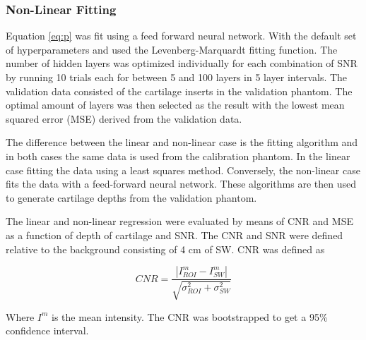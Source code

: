 \documentclass[a4paper,11pt]{article}
\begin{document}
\subsubsection{Non-Linear Fitting}


Equation \ref{eq:p} was fit using a feed forward neural network. With the default set of hyperparameters and used the Levenberg-Marquardt fitting function. The number of hidden layers was optimized individually for each combination of SNR by running 10 trials each for between 5 and 100 layers in 5 layer intervals. The validation data consisted of the cartilage inserts in the validation phantom. The optimal amount of layers was then selected as the result with the lowest mean squared error (MSE) derived from the validation data.

The difference between the linear and non-linear case is the fitting algorithm and in both cases the same data is used from the calibration phantom. In the linear case fitting the data using a least squares method. Conversely, the non-linear case fits the data with a feed-forward neural network. These algorithms are then used to generate cartilage depths from the validation phantom.

The linear and non-linear regression were evaluated by means of CNR and MSE as a function of depth of cartilage and SNR. The CNR and SNR were defined relative to the background consisting of 4 cm of SW. CNR was defined as

\begin{equation}
\label{eq:f}
CNR = \frac{|I^m_{ROI} - I^m_{SW}|}{\sqrt{\sigma^2_{ROI} + \sigma^2_{SW}}}
\end{equation}

Where $I^m$ is the mean intensity. The CNR was bootstrapped to get a 95\% confidence interval.
\end{document}
